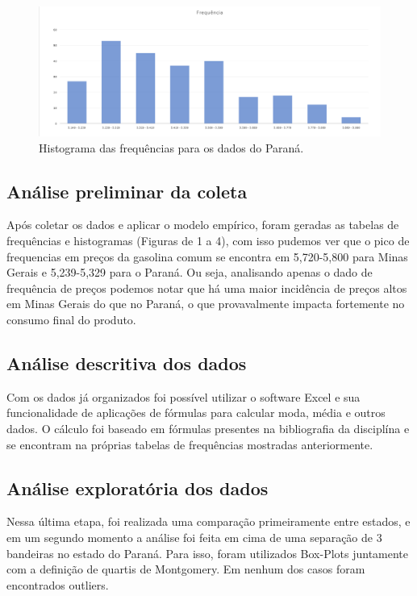 \documentclass[12pt]{article}
\begin{document}
\begin{figure}[H]
    \includegraphics[width=\linewidth]{histograma_pr.png}
    \caption{Histograma das frequências para os dados do Paraná.}
\end{figure}

\subsection{Análise preliminar da coleta}

Após coletar os dados e aplicar o modelo empírico, foram geradas as tabelas de frequências e histogramas (Figuras de 1 a 4), com isso pudemos ver que o pico de frequencias em preços da gasolina comum se encontra em 5,720-5,800 para Minas Gerais e 5,239-5,329 para o Paraná. Ou seja, analisando apenas o dado de frequência de preços podemos notar que há uma maior incidência de preços altos em Minas Gerais do que no Paraná, o que provavalmente impacta fortemente no consumo final do produto.

\subsection{Análise descritiva dos dados}

Com os dados já organizados foi possível utilizar o software Excel e sua funcionalidade de aplicações de fórmulas para calcular moda, média e outros dados. O cálculo foi baseado em fórmulas presentes na bibliografia da disciplína e se encontram na próprias tabelas de frequências mostradas anteriormente.

\subsection{Análise exploratória dos dados}

Nessa última etapa, foi realizada uma comparação primeiramente entre estados, e em um segundo momento a análise foi feita em cima de uma separação de 3 bandeiras no estado do Paraná. Para isso, foram utilizados Box-Plots juntamente com a definição de quartis de Montgomery. Em nenhum dos casos foram encontrados outliers.
\end{document}
